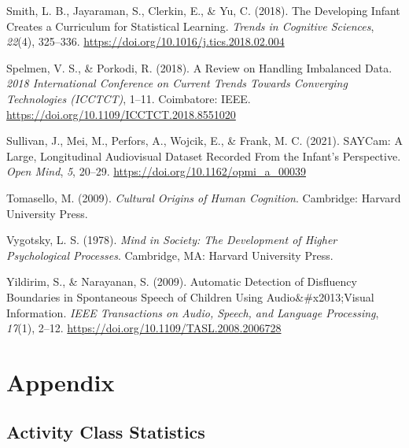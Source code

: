 \documentclass[
  man,floatsintext]{apa6}
\newlength{\cslhangindent}
\newenvironment{CSLReferences}[2] %
 {\begin{list}{}{%
  \setlength{\itemindent}{0pt}
  \setlength{\leftmargin}{0pt}
  \setlength{\parsep}{0pt}
  \ifodd #1
   \setlength{\leftmargin}{\cslhangindent}
   \setlength{\itemindent}{-1\cslhangindent}
  \fi
  \setlength{\itemsep}{#2\baselineskip}}}
 {\end{list}}
\begin{document}
\begin{CSLReferences}{1}{0}
Smith, L. B., Jayaraman, S., Clerkin, E., \& Yu, C. (2018). The {Developing Infant Creates} a {Curriculum} for {Statistical Learning}. \emph{Trends in Cognitive Sciences}, \emph{22}(4), 325--336. \url{https://doi.org/10.1016/j.tics.2018.02.004}

Spelmen, V. S., \& Porkodi, R. (2018). A {Review} on {Handling Imbalanced Data}. \emph{2018 {International Conference} on {Current Trends} Towards {Converging Technologies} ({ICCTCT})}, 1--11. Coimbatore: IEEE. \url{https://doi.org/10.1109/ICCTCT.2018.8551020}

Sullivan, J., Mei, M., Perfors, A., Wojcik, E., \& Frank, M. C. (2021). {SAYCam}: {A Large}, {Longitudinal Audiovisual Dataset Recorded From} the {Infant}'s {Perspective}. \emph{Open Mind}, \emph{5}, 20--29. \url{https://doi.org/10.1162/opmi_a_00039}

Tomasello, M. (2009). \emph{Cultural {Origins} of {Human Cognition}}. Cambridge: Harvard University Press.

Vygotsky, L. S. (1978). \emph{Mind in {Society}: {The Development} of {Higher Psychological Processes}}. Cambridge, MA: Harvard University Press.

Yildirim, S., \& Narayanan, S. (2009). Automatic {Detection} of {Disfluency Boundaries} in {Spontaneous Speech} of {Children Using Audio}\&\#x2013;{Visual Information}. \emph{IEEE Transactions on Audio, Speech, and Language Processing}, \emph{17}(1), 2--12. \url{https://doi.org/10.1109/TASL.2008.2006728}

\end{CSLReferences}

\endgroup

\newpage

\section{Appendix}\label{appendix}

\subsection{Activity Class Statistics}\label{activity-class-statistics}
\end{document}
